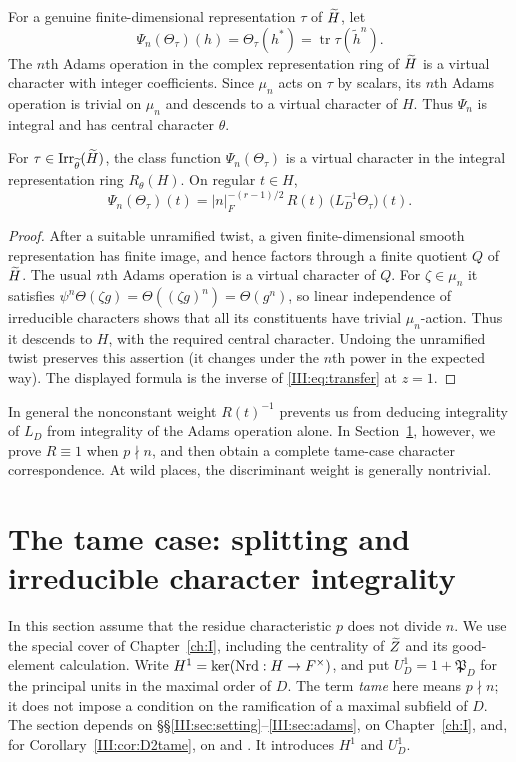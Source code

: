 For a genuine finite-dimensional representation $\tau$ of $\widetilde H$, let
\[
\Psi_n(\Theta_\tau)(h)=\Theta_\tau(h^*)=\operatorname{tr}\tau(\widetilde h^n).
\]
The $n$th Adams operation in the complex representation ring of $\widetilde H$ is a virtual character with integer coefficients. Since $\mu_n$ acts on $\tau$ by scalars, its $n$th Adams operation is trivial on $\mu_n$ and descends to a virtual character of $H$. Thus $\Psi_n$ is integral and has central character $\theta$.

\begin{proposition}\label{III:prop:adams}
For $\tau\in\operatorname{Irr}_{\widetilde\theta}(\widetilde H)$, the class function $\Psi_n(\Theta_\tau)$ is a virtual character in the integral representation ring $R_\theta(H)$. On regular $t\in H$,
\begin{equation}\label{III:eq:adamsweight}
\Psi_n(\Theta_\tau)(t)=
|n|_F^{-(r-1)/2}\,R(t)\,\bigl(L_D^{-1}\Theta_\tau\bigr)(t).
\end{equation}
\end{proposition}
\begin{proof}
After a suitable unramified twist, a given finite-dimensional smooth representation has finite image, and hence factors through a finite quotient $Q$ of $\widetilde H$. The usual $n$th Adams operation is a virtual character of $Q$. For $\zeta\in\mu_n$ it satisfies $\psi^n\Theta(\zeta g)=\Theta((\zeta g)^n)=\Theta(g^n)$, so linear independence of irreducible characters shows that all its constituents have trivial $\mu_n$-action. Thus it descends to $H$, with the required central character. Undoing the unramified twist preserves this assertion (it changes under the $n$th power in the expected way). The displayed formula is the inverse of \eqref{III:eq:transfer} at $z=1$.
\end{proof}

In general the nonconstant weight $R(t)^{-1}$ prevents us from deducing integrality of $L_D$ from integrality of the Adams operation alone. In Section~\ref{III:sec:tame}, however, we prove $R\equiv1$ when $p\nmid n$, and then obtain a complete tame-case character correspondence. At wild places, the discriminant weight is generally nontrivial.


\section{The tame case: splitting and irreducible character integrality}\label{III:sec:tame}
In this section assume that the residue characteristic $p$ does not divide $n$.
We use the special cover of Chapter~\ref{ch:I}, including the centrality of $\widetilde Z$ and
its good-element calculation. Write $H^1=\ker(\operatorname{Nrd}:H\to F^\times)$,
and put $U_D^1=1+\mathfrak P_D$ for the principal units in the maximal
order of $D$. The term \emph{tame} here means $p\nmid n$; it does not
impose a condition on the ramification of a maximal subfield of $D$. The section depends on \S\S\ref{III:sec:setting}--\ref{III:sec:adams}, on Chapter~\ref{ch:I}, and, for Corollary~\ref{III:cor:D2tame}, on \cite{DKV84} and \cite{Zo23}. It introduces $H^1$ and $U_D^1$.

